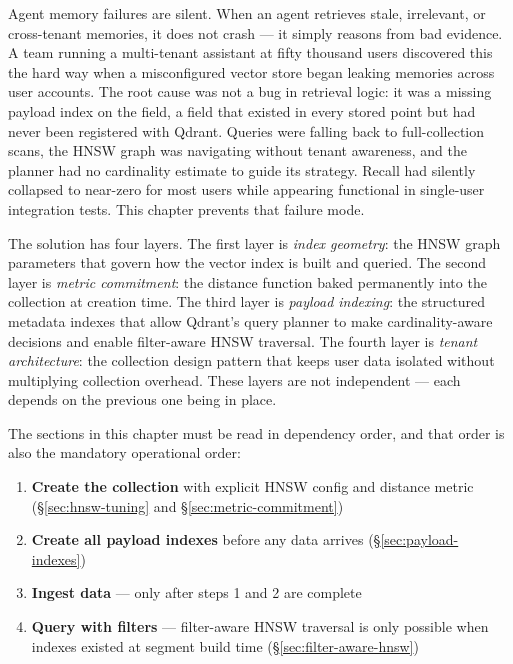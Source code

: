 

Agent memory failures are silent. When an agent retrieves stale, irrelevant,
or cross-tenant memories, it does not crash --- it simply reasons from bad
evidence. A team running a multi-tenant assistant at fifty thousand users
discovered this the hard way when a misconfigured vector store began leaking
memories across user accounts. The root cause was not a bug in retrieval
logic: it was a missing payload index on the  field, a field
that existed in every stored point but had never been registered with Qdrant.
Queries were falling back to full-collection scans, the HNSW graph was
navigating without tenant awareness, and the planner had no cardinality
estimate to guide its strategy. Recall had silently collapsed to near-zero
for most users while appearing functional in single-user integration tests.
This chapter prevents that failure mode.

The solution has four layers. The first layer is \emph{index geometry}: the
HNSW graph parameters that govern how the vector index is built and queried.
The second layer is \emph{metric commitment}: the distance function baked
permanently into the collection at creation time. The third layer is
\emph{payload indexing}: the structured metadata indexes that allow Qdrant's
query planner to make cardinality-aware decisions and enable filter-aware HNSW
traversal. The fourth layer is \emph{tenant architecture}: the collection
design pattern that keeps user data isolated without multiplying collection
overhead. These layers are not independent --- each depends on the previous one
being in place.

The sections in this chapter must be read in dependency order, and that order
is also the mandatory operational order:

\begin{enumerate}
  \item \textbf{Create the collection} with explicit HNSW config and distance metric (\S\ref{sec:hnsw-tuning} and \S\ref{sec:metric-commitment})
  \item \textbf{Create all payload indexes} before any data arrives (\S\ref{sec:payload-indexes})
  \item \textbf{Ingest data} --- only after steps 1 and 2 are complete
  \item \textbf{Query with filters} --- filter-aware HNSW traversal is only possible when indexes existed at segment build time (\S\ref{sec:filter-aware-hnsw})
\end{enumerate}

